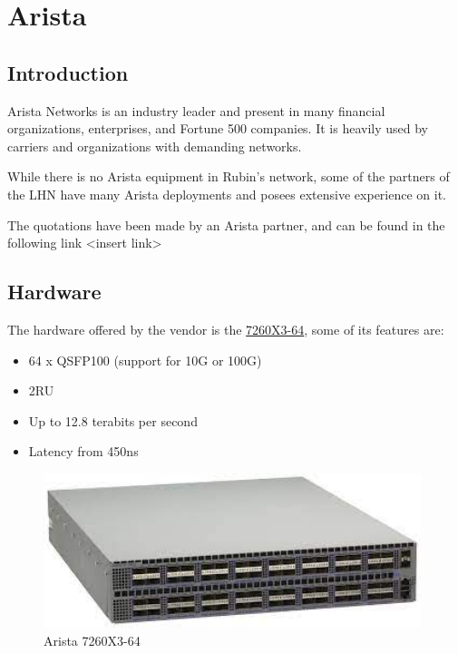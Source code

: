 \section{Arista}

\subsection{Introduction}

Arista Networks is an industry leader and present in many financial organizations, enterprises, and Fortune 500 companies. It is heavily used by carriers and organizations with demanding networks. 

While there is no Arista equipment in Rubin's network, some of the partners of the LHN have many Arista deployments and posees extensive experience on it. 

The quotations have been made by an Arista partner, and can be found in the following link <insert link>

\subsection{Hardware}

The hardware offered by the vendor is the \href{https://www.arista.com/assets/data/pdf/Datasheets/7260X3_Datasheet.pdf}{7260X3-64}, some of its features are:
\begin{itemize}
    \item 64 x QSFP100 (support for 10G or 100G)
    \item 2RU
    \item Up to 12.8 terabits per second
    \item Latency from 450ns
    
\end{itemize}

\begin{figure}
    \includegraphics[width=11cm]{images/arista_7260X3-64.jpg}
    \centering
    \caption{Arista 7260X3-64}
  \end{figure}

